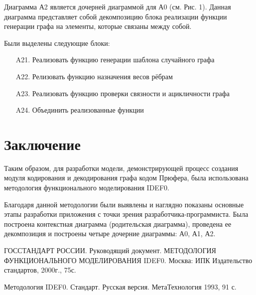 \documentclass[a4paper, final]{article}
\begin{document}
Диаграмма А2 является дочерней диаграммой для А0 (см. Рис. 1). Данная диаграмма представляет собой декомпозицию
блока реализации функции генерации графа на элементы, которые связаны между собой. 

Были выделены следующие блоки:
\begin{itemize}
	\item[A21.] Реализовать функцию генерации шаблона случайного графа
	\item[A22.] Релизовать функцию назначения весов рёбрам
	\item[A23.] Реализовать функцию проверки связности и ацикличности графа
	\item[A24.] Объединить реализованные функции
\end{itemize} 

\newpage
\hypertarget{img:A2}{}



\cleardoublepage
{}
\newpage
{}
\section*{Заключение}
Таким образом, для разработки модели, демонстрирующей процесс создания модуля кодирования и декодирования графа кодом Прюфера,
была использована методология функционального моделирования IDEF0.

Благодаря данной методологии были выявлены и наглядно показаны основные этапы разработки приложения с точки зрения 
разработчика-программиста. Была построена контекстная диаграмма (родительская диаграмма), проведена ее декомпозиция и 
построены четыре дочерние диаграммы: А0, А1, А2. 

\cleardoublepage
{}
\newpage
\begin{thebibliography}{0}
	ГОССТАНДАРТ РОССИИ. Руководящий документ. МЕТОДОЛОГИЯ ФУНКЦИОНАЛЬНОГО МОДЕЛИРОВАНИЯ IDEF0. 
	Москва: ИПК Издательство стандартов, 2000г., 75с.

	Методология IDEF0. Стандарт. Русская версия. МетаТехнология 1993, 91 с.
\end{thebibliography}
\end{document}
